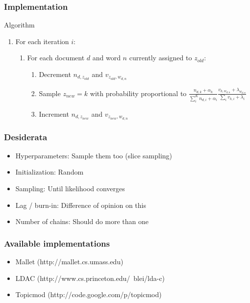 \begin{frame}

\frametitle{Implementation}

\begin{block}{Algorithm}
\begin{enumerate}
\item For each iteration $i$:
\begin{enumerate}
\item For each document $d$ and word $n$ currently assigned to $z_{old}$:
\begin{enumerate}
\item Decrement $n_{d,z_{old}}$ and $v_{z_{old}, w_{d,n}}$
\item Sample $z_{new} = k$ with probability proportional to $\frac{n_{d, k} + \alpha_k}{ \sum_{i}^{K} { n_{d,i} + \alpha_i}} \frac{v_{k, w_{d,n}} + \lambda_{w_{d,n}}}{ \sum_{i} { v_{k,i} + \lambda_{i}}}$
\item Increment $n_{d,z_{new}}$ and $v_{z_{new}, w_{d,n}}$
\end{enumerate}
\end{enumerate}
\end{enumerate}
\end{block}

\end{frame}


\begin{frame}
\frametitle{Desiderata}
\begin{itemize}
\item Hyperparameters: Sample them too (slice sampling)
\item Initialization: Random
\item Sampling: Until likelihood converges
\item Lag / burn-in: Difference of opinion on this
\item Number of chains: Should do more than one
\end{itemize}
\end{frame}

\begin{frame}
	\frametitle{Available implementations}

	\begin{itemize}
		\item Mallet (http://mallet.cs.umass.edu)
		\item LDAC (http://www.cs.princeton.edu/~blei/lda-c)
		\item Topicmod (http://code.google.com/p/topicmod)
	\end{itemize}
\end{frame}
